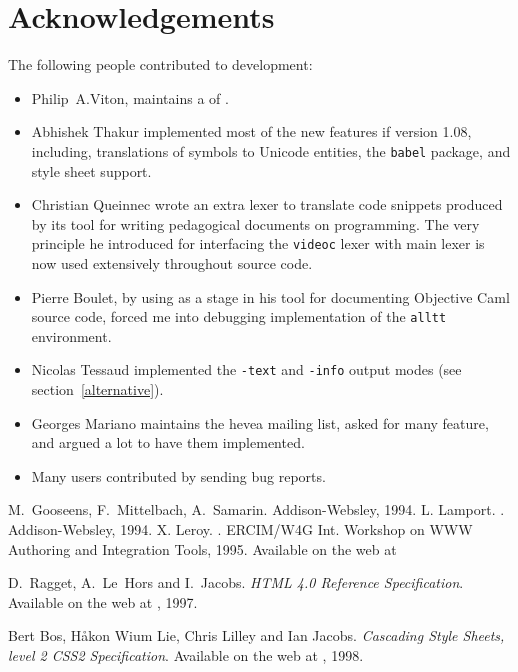 \section{Acknowledgements}
The following people contributed to \hevea{} development:
\begin{itemize}
\item Philip~A.Viton, maintains a
 of \hevea.
\item Abhishek Thakur implemented most of the new features if version
1.08, including, translations of symbols to Unicode entities,
the  \texttt{babel} package, and style sheet support.
\item Christian Queinnec wrote an extra lexer to translate code
snippets produced by its tool
for writing pedagogical documents on programming.
The very principle he introduced for interfacing the \texttt{videoc}
lexer with \hevea{} main lexer is now used extensively throughout
\hevea{} source code.
\item Pierre Boulet, by using \hevea{} as a stage in his tool
for documenting Objective Caml source code, forced me into debugging
\hevea{} implementation of the \verb+alltt+ environment.
\item Nicolas Tessaud implemented the \verb+-text+ and \verb+-info+
output modes (see section~\ref{alternative}).
\item Georges Mariano maintains the hevea mailing list, asked for
many feature, and argued a lot to have them implemented.
\item Many users contributed by sending bug reports.
\end{itemize}

\begin{thebibliography}{xxxxxxxxxx}
M.~Gooseens, F.~Mittelbach, A.~Samarin.
\newblock Addison-Websley, 1994.
L. Lamport.
.
\newblock Addison-Websley, 1994.
X. Leroy.
.
\newblock ERCIM/W4G Int. Workshop on WWW Authoring and Integration
Tools, 1995.
\newblock Available on the web at

D.~Ragget, A.~Le~Hors and I.~Jacobs.
{\em HTML 4.0 Reference Specification}. Available on the web at
, 1997.

Bert Bos,  H{\aa}kon Wium Lie,
Chris Lilley and Ian Jacobs.
{\em Cascading Style Sheets, level 2 CSS2 Specification}. Available on
the web at
, 1998.

\end{thebibliography}
\printindex
\cutend\cutend

